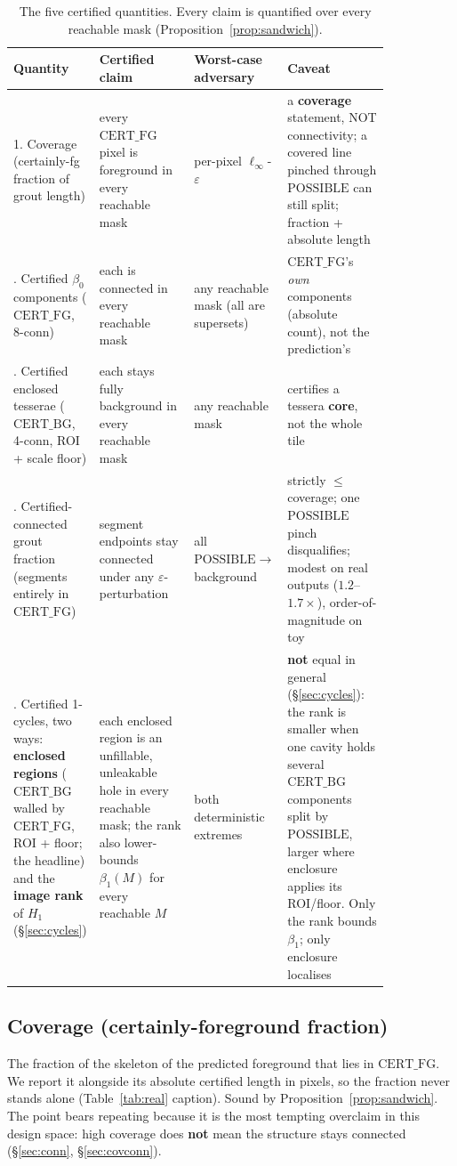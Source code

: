 \documentclass[10pt]{article}
\newcommand{\CFG}{\mathrm{CERT\_FG}}
\newcommand{\CBG}{\mathrm{CERT\_BG}}
\newcommand{\POSS}{\mathrm{POSSIBLE}}
\newcommand{\eps}{\varepsilon}
\begin{document}
\begin{table}[t]
\centering
\caption{The five certified quantities. Every claim is quantified over
every reachable mask (Proposition~\ref{prop:sandwich}).}
\label{tab:quantities}
\small
\setlength{\tabcolsep}{4pt}
\begin{tabular}{L{0.15\linewidth}L{0.26\linewidth}L{0.15\linewidth}L{0.28\linewidth}}
\toprule
\textbf{Quantity} & \textbf{Certified claim} & \textbf{Worst-case adversary} & \textbf{Caveat} \\
. Coverage (certainly-fg fraction of grout length) &
every $\CFG$ pixel is foreground in every reachable mask &
per-pixel $\ell_\infty$-$\eps$ &
a \textbf{coverage} statement, NOT connectivity; a covered line pinched
through $\POSS$ can still split; fraction + absolute length \\
. Certified $\beta_0$ components ($\CFG$, 8-conn) &
each is connected in every reachable mask &
any reachable mask (all are supersets) &
$\CFG$'s \emph{own} components (absolute count), not the prediction's \\
. Certified enclosed tesserae ($\CBG$, 4-conn, ROI + scale floor) &
each stays fully background in every reachable mask &
any reachable mask &
certifies a tessera \textbf{core}, not the whole tile \\
. Certified-connected grout fraction (segments entirely in $\CFG$) &
segment endpoints stay connected under any $\eps$-perturbation &
all $\POSS \to$ background &
strictly $\le$ coverage; one $\POSS$ pinch disqualifies; modest on real
outputs ($1.2$--$1.7\times$), order-of-magnitude on toy \\
. Certified 1-cycles, two ways: \textbf{enclosed regions} ($\CBG$ walled
by $\CFG$, ROI + floor; the headline) and the \textbf{image rank} of
$H_1$ (\S\ref{sec:cycles}) &
each enclosed region is an unfillable, unleakable hole in every reachable
mask; the rank also lower-bounds $\beta_1(M)$ for every reachable $M$ &
both deterministic extremes &
\textbf{not} equal in general (\S\ref{sec:cycles}): the rank is smaller
when one cavity holds several $\CBG$ components split by $\POSS$, larger
where enclosure applies its ROI/floor. Only the rank bounds $\beta_1$; only
enclosure localises \\
\bottomrule
\end{tabular}
\end{table}

\subsection{Coverage (certainly-foreground fraction)}
The fraction of the skeleton of the predicted foreground that lies in
$\CFG$. We report it alongside its absolute certified length in pixels,
so the fraction never stands alone (Table~\ref{tab:real} caption). Sound by
Proposition~\ref{prop:sandwich}. The point bears repeating
because it is the most tempting overclaim in this design space: high
coverage does \textbf{not} mean the structure stays connected
(\S\ref{sec:conn}, \S\ref{sec:covconn}).
\end{document}
